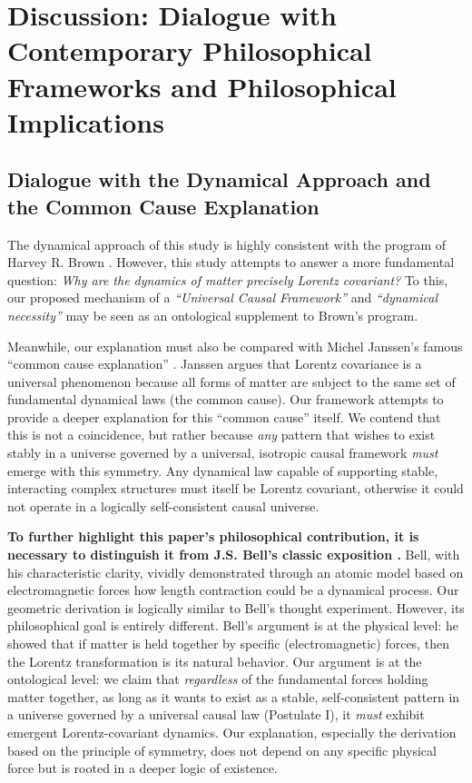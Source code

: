 \documentclass[11pt, a4paper]{article}
\begin{document}
\section{Discussion: Dialogue with Contemporary Philosophical Frameworks and Philosophical Implications}

\subsection{Dialogue with the Dynamical Approach and the Common Cause Explanation}
The dynamical approach of this study is highly consistent with the program of Harvey R. Brown \cite{Brown2005}. However, this study attempts to answer a more fundamental question: \textit{Why are the dynamics of matter precisely Lorentz covariant?} To this, our proposed mechanism of a \textit{``Universal Causal Framework''} and \textit{``dynamical necessity''} may be seen as an ontological supplement to Brown's program.

Meanwhile, our explanation must also be compared with Michel Janssen's famous ``common cause explanation'' \cite{Janssen2002}. Janssen argues that Lorentz covariance is a universal phenomenon because all forms of matter are subject to the same set of fundamental dynamical laws (the common cause). Our framework attempts to provide a deeper explanation for this ``common cause'' itself. We contend that this is not a coincidence, but rather because \textit{any} pattern that wishes to exist stably in a universe governed by a universal, isotropic causal framework \textit{must} emerge with this symmetry. Any dynamical law capable of supporting stable, interacting complex structures must itself be Lorentz covariant, otherwise it could not operate in a logically self-consistent causal universe.

\textbf{To further highlight this paper's philosophical contribution, it is necessary to distinguish it from J.S. Bell's classic exposition \cite{Bell1976}.} Bell, with his characteristic clarity, vividly demonstrated through an atomic model based on electromagnetic forces how length contraction could be a dynamical process. Our geometric derivation is logically similar to Bell's thought experiment. However, its philosophical goal is entirely different. Bell's argument is at the physical level: he showed that if matter is held together by specific (electromagnetic) forces, then the Lorentz transformation is its natural behavior. Our argument is at the ontological level: we claim that \textit{regardless} of the fundamental forces holding matter together, as long as it wants to exist as a stable, self-consistent pattern in a universe governed by a universal causal law (Postulate I), it \textit{must} exhibit emergent Lorentz-covariant dynamics. Our explanation, especially the derivation based on the principle of symmetry, does not depend on any specific physical force but is rooted in a deeper logic of existence.
\end{document}
